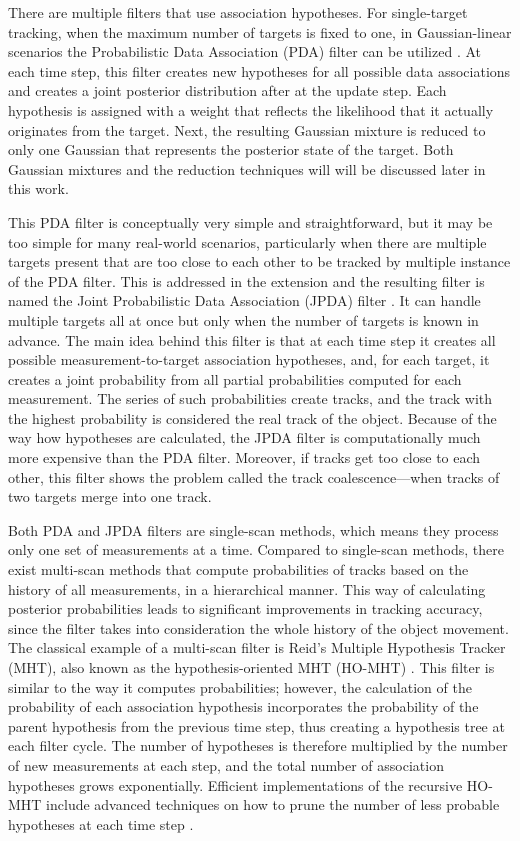 There are multiple filters that use association hypotheses. For single-target tracking, when the maximum number of targets is fixed to one, in Gaussian-linear scenarios the Probabilistic Data Association (PDA) filter can be utilized \cite{bar-shalomProbabilisticDataAssociation2009}. At each time step, this filter creates new hypotheses for all possible data associations and creates a joint posterior distribution after at the update step. Each hypothesis is assigned with a weight that reflects the likelihood that it actually originates from the target. Next, the resulting Gaussian mixture is reduced to only one Gaussian that represents the posterior state of the target. Both Gaussian mixtures and the reduction techniques will will be discussed later in this work.

This PDA filter is conceptually very simple and straightforward, but it may be too simple for many real-world scenarios, particularly when there are multiple targets present that are too close to each other to be tracked by multiple instance of the PDA filter. This is addressed in the extension and the resulting filter is named the Joint Probabilistic Data Association (JPDA) filter \cite{bar-shalomMultitargetmultisensorTrackingPrinciples1995}. It can handle multiple targets all at once but only when the number of targets is known in advance. The main idea behind this filter is that at each time step it creates all possible measurement-to-target association hypotheses, and, for each target, it creates a joint probability from all partial probabilities computed for each measurement. The series of such probabilities create tracks, and the track with the highest probability is considered the real track of the object. Because of the way how hypotheses are calculated, the JPDA filter is computationally much more expensive than the PDA filter. Moreover, if tracks get too close to each other, this filter shows the problem called the track coalescence—when tracks of two targets merge into one track.

Both PDA and JPDA filters are single-scan methods, which means they process only one set of measurements at a time. Compared to single-scan methods, there exist multi-scan methods that compute probabilities of tracks based on the history of all measurements, in a hierarchical manner. This way of calculating posterior probabilities leads to significant improvements in tracking accuracy, since the filter takes into consideration the whole history of the object movement. The classical example of a multi-scan filter is Reid's Multiple Hypothesis Tracker (MHT), also known as the hypothesis-oriented MHT (HO-MHT) \cite{reidAlgorithmTrackingMultiple1979}. This filter is similar to the way it computes probabilities; however, the calculation of the probability of each association hypothesis incorporates the probability of the parent hypothesis from the previous time step, thus creating a hypothesis tree at each filter cycle. The number of hypotheses is therefore multiplied by the number of new measurements at each step, and the total number of association hypotheses grows exponentially. Efficient implementations of the recursive HO-MHT include advanced techniques on how to prune the number of less probable hypotheses at each time step \cite{coxEfficientImplementationReid1996}.

